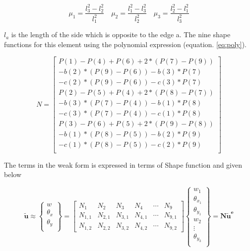 \documentclass[main.tex]{subfiles}
\begin{document}
\begin{equation}
\mu_1 = \frac{l_3^2-l_2^2}{l_1^2} \quad
\mu_2 = \frac{l_1^2-l_3^2}{l_2^2} \quad
\mu_3 = \frac{l_2^2-l_1^2}{l_3^2}
\end{equation}

$l_a$ is the length of the side which is opposite to the edge a. The nine shape functions for this element using the polynomial expression (equation. \ref{eq:poly}).

\begin{equation}
N = 
\begin{bmatrix}
                 P(1)-P(4)+P(6)+2*(P(7)-P(9))\\
                 -b(2)*(P(9)-P(6))-b(3)*P(7)\\
                 -c(2)*(P(9)-P(6))-c(3)*P(7)\\
                 P(2)-P(5)+P(4)+2*(P(8)-P(7))\\
                 -b(3)*(P(7)-P(4))-b(1)*P(8)\\
                 -c(3)*(P(7)-P(4))-c(1)*P(8)\\
                 P(3)-P(6)+P(5)+2*(P(9)-P(8))\\
                -b(1)*(P(8)-P(5))-b(2)*P(9)\\
                -c(1)*(P(8)-P(5))-c(2)*P(9)\\
\end{bmatrix}
\end{equation}

The terms in the weak form is expressed in terms of Shape function and given below





\begin{equation*}
\tilde{\mathbf{u}}  \approx 
\left\{
\begin{array}{r}
w \\
\theta_x \\
\theta_y \\
\end{array} \right\}
=
\begin{bmatrix}
{N}_{1} & N_{2} & N_{3} &{N}_{4} &\cdots & N_{9} \\
{N}_{1,1} & N_{2,1} & N_{3,1} &{N}_{4,1} &\cdots & N_{9,1} \\
{N}_{1,2} & N_{2,2} & N_{3,2} &{N}_{4,2} &\cdots & N_{9,2} 
\end{bmatrix} 
\left\{
\begin{array}{r}
w_1 \\
\theta_{x_1} \\
\theta_{y_1} \\
w_2 \\
\vdots \\
\theta_{y_{3}} \\
\end{array} \right\}
=
\mathbf{N} \mathbf{\tilde{u}^e} 
\end{equation*}
\end{document}

